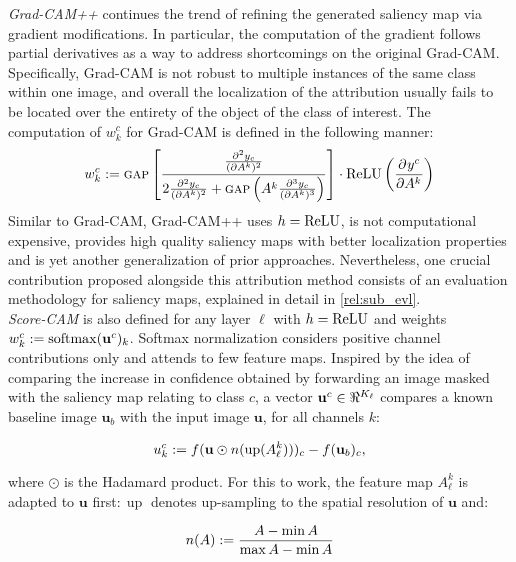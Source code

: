 \noindent \emph{Grad-CAM++} \autocite{chattopadhay2018grad} continues the trend of refining the 
generated saliency map via gradient modifications. In particular, the computation of the gradient 
follows partial derivatives as a way to address shortcomings on the original Grad-CAM. Specifically, 
Grad-CAM is not robust to multiple instances of the same class within one image, and overall the 
localization of the attribution usually fails to be located over the entirety of the object of 
the class of interest. The computation of $w^c_k$ for Grad-CAM is defined in the following manner:
\begin{equation}
	w^c_k \mathrel{:=} {\textsc{gap}} \left[\frac{\frac{\partial^2 y_c}{(\partial A^k)^2}}{2\frac{\partial^2 y_c}
	{(\partial A^k)^2}+{\textsc{gap}}\left(A^k \frac{\partial^3 y_c}{(\partial A^k)^3}\right)}\right] \cdot 
	{\operatorname{ReLU}} \left(\frac{\partial^{}{y^c}}{\partial{{A^k}^{}}}\right)
	\label{eq:gcampp_coeff}
\end{equation}
Similar to Grad-CAM, Grad-CAM++ uses $h = {\operatorname{ReLU}}$, is not computational expensive, 
provides high quality saliency maps with better localization properties and is yet another 
generalization of prior approaches. Nevertheless, one crucial contribution proposed alongside this 
attribution method consists of an evaluation methodology for saliency maps, explained in detail in 
\autoref{rel:sub_evl}.\\

\noindent\emph{Score-CAM} \autocite{wang2020score} is also defined for any layer $\ell$ with 
$h = {\operatorname{ReLU}}$ and weights $w^c_k \mathrel{:=} \operatorname{softmax}(\mathbf{u}^c)_k$.  Softmax normalization considers 
positive channel contributions only and attends to few feature maps. Inspired by the idea of 
comparing the increase in confidence obtained by forwarding an image masked with the saliency map 
relating to class $c$, a vector $\mathbf{u}^c \in \real^{K_\ell}$ compares a known baseline image 
$\mathbf{u}_b$ with the input image $\mathbf{u}$, for all channels $k$:

\begin{equation}
	u^c_k \mathrel{:=} f(\mathbf{u} \odot n(\operatorname{up}( A^k_\ell )))_c - f(\mathbf{u}_b)_c,
\label{eq:s-cam}
\end{equation}

where $\odot$ is the Hadamard product. For this to work, the feature map $A^k_\ell$ is adapted 
to $\mathbf{u}$ first$:\operatorname{up}$ denotes up-sampling to the spatial resolution of 
$\mathbf{u}$ and:

\begin{equation}
	n(A) \mathrel{:=} \frac{A - \min A}{\max A - \min A}
\label{eq:norm}
\end{equation}

